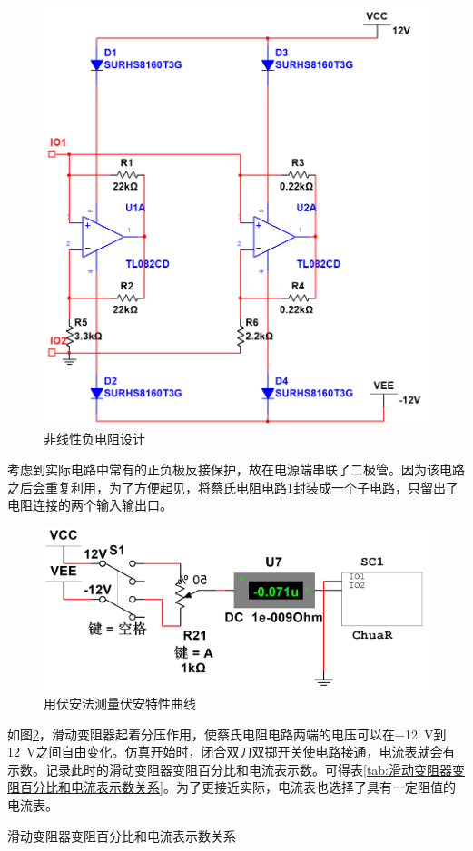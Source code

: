 \documentclass{article}
\begin{document}
\begin{figure}[htbp]
	\centering
	\includegraphics[width=.6\linewidth]{ChuaR0.png}
	\caption{非线性负电阻设计}
	\label{fig:非线性负电阻设计}
\end{figure}

考虑到实际电路中常有的正负极反接保护，故在电源端串联了二极管。因为该电路之后会重复利用，为了方便起见，将蔡氏电阻电路\ref{fig:非线性负电阻设计}封装成一个子电路，只留出了电阻连接的两个输入输出口。

\begin{figure}[htpb]
	\centering
	\includegraphics[width=0.7\linewidth]{ChuaR1.png}
	\caption{用伏安法测量伏安特性曲线}
	\label{fig:用伏安法测量伏安特性曲线}
\end{figure}

如图\ref{fig:用伏安法测量伏安特性曲线}，滑动变阻器起着分压作用，使蔡氏电阻电路两端的电压可以在\SI{-12}{V}到\SI{+12}{V}之间自由变化。仿真开始时，闭合双刀双掷开关使电路接通，电流表就会有示数。记录此时的滑动变阻器变阻百分比和电流表示数。可得表\ref{tab:滑动变阻器变阻百分比和电流表示数关系}。为了更接近实际，电流表也选择了具有一定阻值的电流表。

\begin{table}[htpb]
	\centering
	\small
	\caption{滑动变阻器变阻百分比和电流表示数关系}
	\label{tab:滑动变阻器变阻百分比和电流表示数关系}
\end{table}
\end{document}
